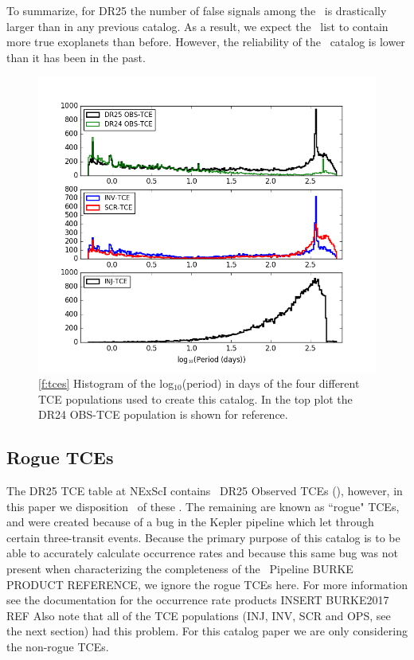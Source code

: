 To summarize, for DR25 the number of false signals among the \opstces\ is drastically larger than in any previous catalog. As a result, we expect the \opstce\ list to contain more true exoplanets than before. However, the reliability of the \opstce\ catalog is lower than it has been in the past.   

\begin{figure}[h!]
 \begin{center}
  \includegraphics[width=1.1\linewidth]{fig-tcePeriods.png}
  \caption{\ref{f:tces} Histogram of the log$_{10}$(period) in days of the four different TCE populations used to create this catalog. In the top plot the DR24 OBS-TCE population is shown for reference.}
 \end{center}
 \end{figure}



\subsection{Rogue TCEs}
The DR25 TCE table at NExScI contains \ntces\ DR25 Observed TCEs (\opstces), however, in this paper we disposition \ntcesnorogue\ of these \opstces. The remaining \opstces are known as ``rogue" TCEs, and were created because of a bug in the Kepler pipeline which let through certain three-transit events. Because the primary purpose of this catalog is to be able to accurately calculate occurrence rates and because this same bug was not present when characterizing the completeness of the \Kepler\ Pipeline \citep{}BURKE PRODUCT REFERENCE, we ignore the rogue TCEs here. For more information see the documentation for the occurrence rate products INSERT BURKE2017 REF%
Also note that all of the TCE populations (INJ, INV, SCR and OPS, see the next section) had this problem. For this catalog paper we are only considering the non-rogue TCEs.